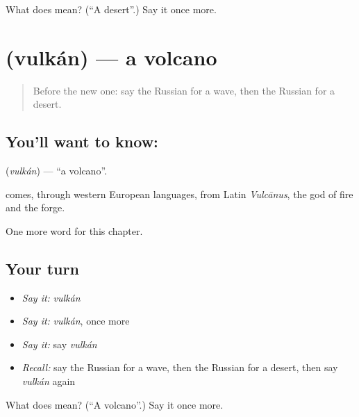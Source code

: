 \begin{tcolorbox}[breakable,colback=teal!4,colframe=teal!35!black,title={Before you move on}]
What does  mean? (\textquotedblleft{}A desert\textquotedblright{}.) Say it once more.
\end{tcolorbox}
\section[\texorpdfstring{\ru{вулкан} (vulkán)}{вулкан (vulkán)}]{ (vulkán) — a volcano}

\label{lesson:RU-C116-volcano}



\begin{quote}
Before the new one: say the Russian for a wave, then the Russian for a desert.
\end{quote}

\subsection*{You'll want to know: }
\textbf{} (\emph{vulkán}) — \textquotedblleft{}a volcano\textquotedblright{}.

\begin{cousinweb}
\textbf{} comes, through western European languages, from Latin \emph{Vulcānus}, the god of fire and the forge.
\end{cousinweb}

\begin{grammarlens}[title={What you've built}]
One more word for this chapter.
\end{grammarlens}

\subsection*{Your turn}
\begin{itemize}
\raggedright
  \item \emph{Say it:} \emph{vulkán}
  \item \emph{Say it:} \emph{vulkán}, once more
  \item \emph{Say it:} say \emph{vulkán}
  \item \emph{Recall:} say the Russian for a wave, then the Russian for a desert, then say \emph{vulkán} again
\end{itemize}

\begin{tcolorbox}[breakable,colback=teal!4,colframe=teal!35!black,title={Before you move on}]
What does  mean? (\textquotedblleft{}A volcano\textquotedblright{}.) Say it once more.
\end{tcolorbox}
